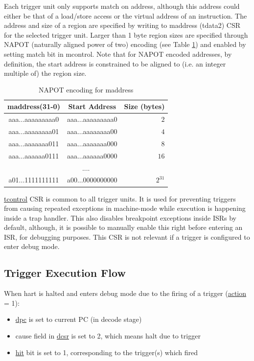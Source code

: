 \documentclass[main\_\_EN.tex]{subfiles}
\begin{document}
Each trigger unit only supports match on address, although this address could either be that of a load/store access or the virtual address of an instruction. The address and size of a region are specified by writing to maddress (tdata2) CSR for the selected trigger unit. Larger than 1 byte region sizes are specified through NAPOT (naturally aligned power of two) encoding (see Table \ref{tab:riscvcpu-hwt-table}) and enabled by setting match bit in mcontrol. Note that for NAPOT encoded addresses, by definition, the start address is constrained to be aligned to (i.e. an integer multiple of) the region size.

\begin{longtable}{ | c | c | r | }
\caption{NAPOT encoding for maddress} \label{tab:riscvcpu-hwt-table}
\\ \hline
\rowcolor{lightgray}
maddress(31-0) & Start Address & Size (bytes) \\ \hline
aaa...aaaaaaaaa0 & aaa...aaaaaaaaa0 & $2$ \\ \hline
aaa...aaaaaaaa01 & aaa...aaaaaaaa00 & $4$ \\ \hline
aaa...aaaaaaa011 & aaa...aaaaaaa000 & $8$ \\ \hline
aaa...aaaaaa0111 & aaa...aaaaaa0000 & $16$ \\ \hline
\multicolumn{3}{c}{....} \\ \hline
a01...1111111111 & a00...0000000000 & $2^{31}$ \\ \hline
\end{longtable}

\hyperref[regdesc:TCONTROL]{tcontrol} CSR is common to all trigger units. It is used for preventing triggers from causing repeated exceptions in machine-mode while execution is happening inside a trap handler. This also disables breakpoint exceptions inside ISRs by default, although, it is possible to manually enable this right before entering an ISR, for debugging purposes. This CSR is not relevant if a trigger is configured to enter debug mode.

\subsection{Trigger Execution Flow}
\label{sec:riscvcpu-hwt-suggest-op}

When hart is halted and enters debug mode due to the firing of a trigger (\hyperref[fielddesc:MCONTROLACTION]{action} = 1):
\begin{itemize}
    \item \hyperref[regdesc:DPC]{dpc} is set to current PC (in decode stage)
    \item cause field in \hyperref[regdesc:DCSR]{dcsr} is set to 2, which means halt due to trigger
    \item \hyperref[fielddesc:MCONTROLHIT]{hit} bit is set to 1, corresponding to the trigger(s) which fired
\end{itemize}
\end{document}
